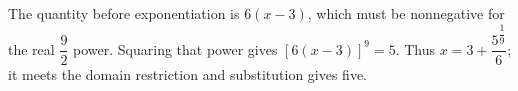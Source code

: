 The quantity before exponentiation is $6(x-3)$, which must be nonnegative for the real $\dfrac{9}{2}$ power. Squaring that power gives $[6(x-3)]^9=5$. Thus $\boxed{x=3+\dfrac{5^{\dfrac{1}{9}}}{6}}$; it meets the domain restriction and substitution gives five.
